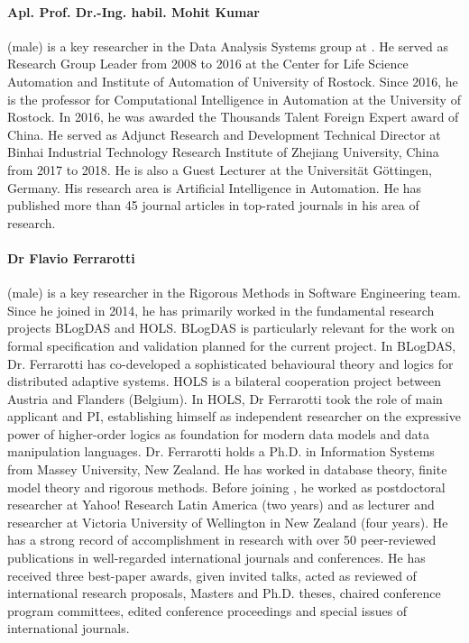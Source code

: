 \documentclass[a4paper,11pt]{article}
\begin{document}
\paragraph{Apl. Prof. Dr.-Ing. habil. Mohit Kumar} (male) is a key researcher in the Data Analysis Systems group at \SCCHshort{}. He served as Research Group Leader from 2008 to 2016 at the Center for Life Science Automation and Institute of Automation of University of Rostock. Since 2016, he is the professor for Computational Intelligence in Automation at the University of Rostock. In 2016, he was awarded the Thousands Talent Foreign Expert award of China. He served as Adjunct Research and Development Technical Director at Binhai Industrial Technology Research Institute of Zhejiang University, China from 2017 to 2018. He is also a Guest Lecturer at the Universität Göttingen, Germany. His research area is Artificial Intelligence in Automation. He has published more than 45 journal articles in top-rated journals in  his area of research. 

\paragraph{Dr Flavio Ferrarotti} (male) is a key researcher in the Rigorous Methods in Software Engineering team. Since he joined \SCCHshort{} in 2014, he has primarily worked in the fundamental research projects BLogDAS and HOLS. BLogDAS is particularly relevant for the work on formal specification and validation planned for the current project. In BLogDAS, Dr. Ferrarotti has co-developed a sophisticated behavioural theory and logics for distributed adaptive systems. HOLS is a bilateral cooperation project between Austria and Flanders (Belgium). In HOLS, Dr Ferrarotti took the role of main applicant and PI, establishing himself as independent researcher on the expressive power of higher-order logics as foundation for modern data models and data manipulation languages. Dr. Ferrarotti holds a Ph.D. in Information Systems from Massey University, New Zealand. He has worked in database theory, finite model theory and rigorous methods. Before joining \SCCHshort{}, he worked as postdoctoral researcher at Yahoo! Research Latin America (two years) and as lecturer and researcher at Victoria University of Wellington in New Zealand (four years). He has a strong record of accomplishment in research with over 50 peer-reviewed publications in well-regarded international journals and conferences. He has received three best-paper awards, given invited talks, acted as reviewed of international research proposals, Masters and Ph.D. theses, chaired conference program committees, edited conference proceedings and special issues of international journals.
\end{document}
